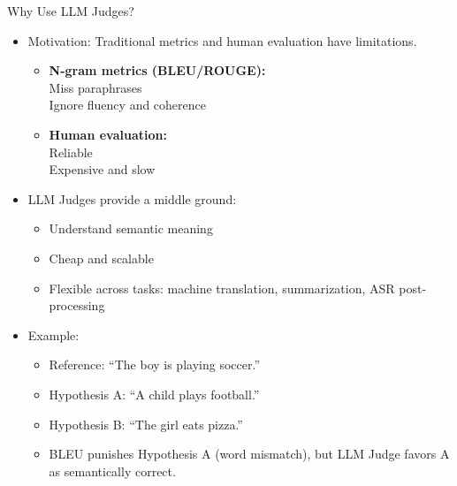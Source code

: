 \begin{frame}[allowframebreaks]{Why Use LLM Judges?}

\begin{itemize}
    \item Motivation: Traditional metrics and human evaluation have limitations.
    \begin{itemize}
        \item \textbf{N-gram metrics (BLEU/ROUGE):}  \\
        Miss paraphrases  \\
        Ignore fluency and coherence
        \item \textbf{Human evaluation:}  \\
        Reliable  \\
        Expensive and slow
    \end{itemize}

    \item LLM Judges provide a middle ground:
    \begin{itemize}
        \item Understand semantic meaning  
        \item Cheap and scalable  
        \item Flexible across tasks: machine translation, summarization, ASR post-processing
    \end{itemize}
\framebreak
    \item Example:
    \begin{itemize}
        \item Reference: ``The boy is playing soccer.''  
        \item Hypothesis A: ``A child plays football.''  
        \item Hypothesis B: ``The girl eats pizza.''  
        \item BLEU punishes Hypothesis A (word mismatch), but LLM Judge favors A as semantically correct.
    \end{itemize}
\end{itemize}

\end{frame}


